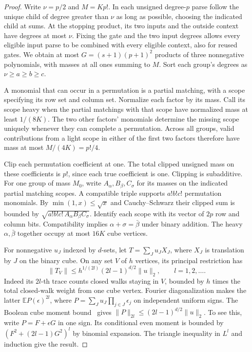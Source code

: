 \documentclass[11pt]{article}
\theoremstyle{definition}
\begin{document}
\begin{proof}
Write \(\nu=p/2\) and \(M=Kp!\). In each unsigned degree-\(p\) parse follow the unique child of degree greater than \(\nu\) as long as possible, choosing the indicated child at sums. At the stopping product, its two inputs and the outside context have degrees at most \(\nu\). Fixing the gate and the two input degrees allows every eligible input parse to be combined with every eligible context, also for reused gates. We obtain at most \(G=(s+1)(p+1)^2\) products of three nonnegative polynomials, with masses at all ones summing to \(M\). Sort each group's degrees as \(\nu\ge a\ge b\ge c\).

A monomial that can occur in a permutation is a partial matching, with a scope specifying its row set and column set. Normalize each factor by its mass. Call its scope heavy when the partial matchings with that scope have normalized mass at least \(1/(8K)\). The two other factors' monomials determine the missing scope uniquely whenever they can complete a permutation. Across all groups, valid contributions from a light scope in either of the first two factors therefore have mass at most \(M/(4K)=p!/4\).

Clip each permutation coefficient at one. The total clipped unsigned mass on these coefficients is \(p!\), since each true coefficient is one. Clipping is subadditive. For one group of mass \(M_0\), write \(A_\alpha,B_\beta,C_\sigma\) for its masses on the indicated partial matching scopes. A compatible triple supports \(a!b!c!\) permutation monomials. By \(\min(1,x)\le\sqrt{x}\) and Cauchy--Schwarz their clipped sum is bounded by
\(\sqrt{a!b!c!\,A_\alpha B_\beta C_\sigma}\).
Identify each scope with its vector of \(2p\) row and column bits. Compatibility implies \(\alpha+\sigma=\bar\beta\) under binary addition. The heavy \(\alpha,\bar\beta\) together occupy at most \(16K\) cube vertices.

For nonnegative \(u_J\) indexed by \(d\)-sets, let \(T=\sum_J u_J X_J\), where \(X_J\) is translation by \(J\) on the binary cube. On any set \(V\) of \(h\) vertices, its principal restriction has
\[
 \|T_V\|\le h^{1/(2l)}(2l-1)^{d/2}\|u\|_2,\qquad l=1,2,\ldots .
\]
Indeed its \(2l\)-th trace counts closed walks staying in \(V\), bounded by \(h\) times the total closed-walk weight from one cube vertex. Fourier diagonalization makes the latter \(\mathbb E P(\epsilon)^{2l}\), where \(P=\sum_Ju_J\prod_{j\in J}\epsilon_j\) on independent uniform signs. The Boolean cube moment bound~\cite{bonami} gives \(\|P\|_{2l}\le(2l-1)^{d/2}\|u\|_2\). To see this, write \(P=F+\epsilon G\) in one sign. Its conditional even moment is bounded by \((F^2+(2l-1)G^2)^l\) by binomial expansion. The triangle inequality in \(L^l\) and induction give the result.


\end{proof}
\end{document}
